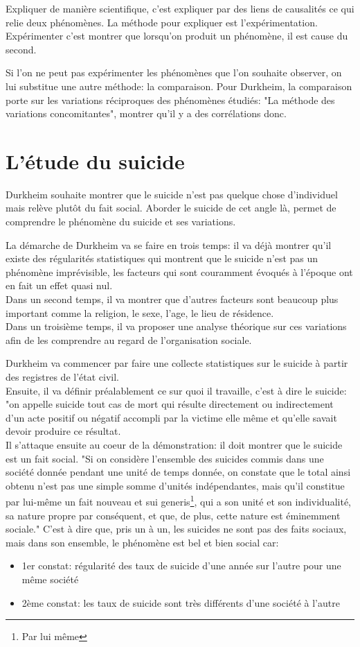 \documentclass[10pt, a4paper, openany]{book}
\begin{document}
Expliquer de manière scientifique, c'est expliquer par des liens de causalités ce qui relie deux phénomènes. La méthode pour expliquer est l'expérimentation. Expérimenter c'est montrer que lorsqu'on produit un phénomène, il est cause du second.

Si l'on ne peut pas expérimenter les phénomènes que l'on souhaite observer, on lui substitue une autre méthode: la comparaison. Pour Durkheim, la comparaison porte sur les variations réciproques des phénomènes étudiés: "La méthode des variations concomitantes", montrer qu'il y a des corrélations donc. 

\section{L'étude du suicide}


Durkheim souhaite montrer que le suicide n'est pas quelque chose d'individuel mais relève plutôt du fait social. Aborder le suicide de cet angle là, permet de comprendre le phénomène du suicide et ses variations. 


La démarche de Durkheim va se faire en trois temps: il va déjà montrer qu'il existe des régularités statistiques qui montrent que le suicide n'est pas un phénomène imprévisible, les facteurs qui sont couramment évoqués à l'époque ont en fait un effet quasi nul. \\
Dans un second temps, il va montrer que d'autres facteurs sont beaucoup plus important comme la religion, le sexe, l'age, le lieu de résidence. \\
Dans un troisième temps, il va proposer une analyse théorique sur ces variations afin de les comprendre au regard de l'organisation sociale.


Durkheim va commencer par faire une collecte statistiques sur le suicide à partir des registres de l'état civil. \\
Ensuite, il va définir préalablement ce sur quoi il travaille, c'est à dire le suicide: "on appelle suicide tout cas de mort qui résulte directement ou indirectement d'un acte positif ou négatif accompli par la victime elle même et qu'elle savait devoir produire ce résultat. \\
Il s'attaque ensuite au coeur de la démonstration: il doit montrer que le suicide est un fait social. "Si on considère l'ensemble des suicides commis dans une société donnée pendant une unité de temps donnée, on constate que le total ainsi obtenu n'est pas une simple somme d'unités indépendantes, mais qu'il constitue par lui-même un fait nouveau et sui generis\footnote{Par lui même}, qui a son unité et son individualité, sa nature propre par conséquent, et que, de plus, cette nature est éminemment sociale." C'est à dire que, pris un à un, les suicides ne sont pas des faits sociaux, mais dans son ensemble, le phénomène est bel et bien social car:
\begin{itemize}
\item 1er constat: régularité des taux de suicide d'une année sur l'autre pour une même société
\item 2ème constat: les taux de suicide sont très différents d'une société à l'autre 
\end{itemize}
\end{document}
